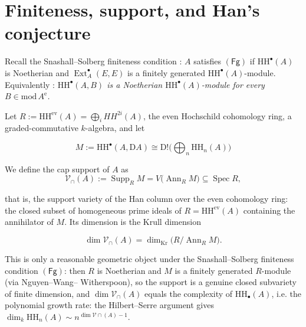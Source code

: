 \documentclass[11pt]{amsart}
\theoremstyle{definition}
\newcommand{\HH}{\mathrm{HH}}
\newcommand{\Ext}{\operatorname{Ext}}
\newcommand{\Ae}{A^{\mathrm{e}}}
\newcommand{\kk}{k}
\newcommand{\Fg}{\mathsf{(Fg)}}
\begin{document}
\section{Finiteness, support, and Han's conjecture}\label{sec:fg}

Recall the Snashall--Solberg finiteness condition \cite{SnashallSolberg,EHSST}:
$A$ satisfies $\Fg$ if $\HH^\bullet(A)$ is Noetherian and
$\Ext^\bullet_A(E,E)$ is a finitely generated $\HH^\bullet(A)$-module.
Equivalently \cite[Prop.~2.3]{NWW}: \emph{$\HH^\bullet(A,B)$ is a Noetherian
$\HH^\bullet(A)$-module for every $B\in\mathrm{mod}\,\Ae$.} 

Let $R := \mathrm{HH}^{\mathrm{ev}}(A)= \bigoplus _i HH^{2i}(A)$, the even Hochschild cohomology ring, a graded-commutative $\kk$-algebra, and let

$$M := \mathrm{HH}^\bullet(A,\mathrm{D}A) \cong \mathrm{D}!\Big(\bigoplus_n \mathrm{HH}_n(A)\Big)$$


We define the cap support of $A$ as $$\mathcal V_{\cap}(A) := \operatorname{Supp}_{R} M = V\big(\operatorname{Ann}_R M\big) \subseteq \operatorname{Spec} R,$$

that is, the support variety of the Han column over the even cohomology ring: the closed subset of homogeneous prime ideals of $R = \mathrm{HH}^{\mathrm{ev}}(A)$ containing the annihilator of $M$. Its dimension is the Krull dimension

$$\dim \mathcal V_{\cap}(A) = \dim_{\mathrm{Kr}}\big(R/\operatorname{Ann}_R M\big).$$

This is only a reasonable geometric object under the Snashall–Solberg finiteness condition $\Fg$: then $R$ is Noetherian and $M$ is a finitely generated $R$-module (via Nguyen–Wang– Witherspoon), so the support is a genuine closed subvariety of finite dimension, and $\dim\mathcal V_\cap(A)$ equals the complexity of $\mathrm{HH}_\bullet(A)$, i.e. the polynomial growth rate: the Hilbert–Serre argument gives $\dim_\kk \mathrm{HH}_n(A) \sim n^{\dim\mathcal V\cap(A) - 1}$.

\end{document}

